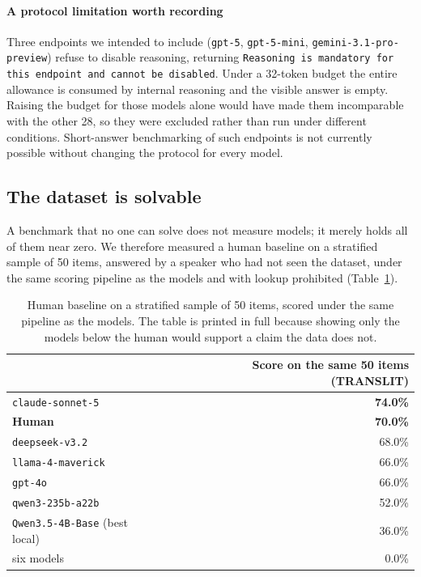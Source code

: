 \documentclass[final]{clv2025}
\begin{document}
\paragraph{A protocol limitation worth recording} Three endpoints we intended
to include (\texttt{gpt-5}, \texttt{gpt-5-mini},
\texttt{gemini-3.1-pro-preview}) refuse to disable reasoning, returning
\texttt{Reasoning is mandatory for this endpoint and cannot be disabled}. Under
a 32-token budget the entire allowance is consumed by internal reasoning and
the visible answer is empty. Raising the budget for those models alone would
have made them incomparable with the other 28, so they were excluded rather
than run under different conditions. Short-answer benchmarking of such
endpoints is not currently possible without changing the protocol for every
model.

\subsection{The dataset is solvable}

A benchmark that no one can solve does not measure models; it merely holds all
of them near zero. We therefore measured a human baseline on a stratified
sample of 50 items, answered by a speaker who had not seen the dataset, under
the same scoring pipeline as the models and with lookup prohibited
(Table~\ref{tab:human}).

\begin{table}[h!]
\caption{Human baseline on a stratified sample of 50 items, scored under the
same pipeline as the models. The table is printed in full because showing only
the models below the human would support a claim the data does not.}
\label{tab:human}
\centering
\begin{tabular}{lr}
\toprule
 & Score on the same 50 items (TRANSLIT) \\
\midrule
\texttt{claude-sonnet-5} & \textbf{74.0\%} \\
\textbf{Human} & \textbf{70.0\%} \\
\texttt{deepseek-v3.2} & 68.0\% \\
\texttt{llama-4-maverick} & 66.0\% \\
\texttt{gpt-4o} & 66.0\% \\
\texttt{qwen3-235b-a22b} & 52.0\% \\
\texttt{Qwen3.5-4B-Base} (best local) & 36.0\% \\
six models & 0.0\% \\
\bottomrule
\end{tabular}
\end{table}
\end{document}
